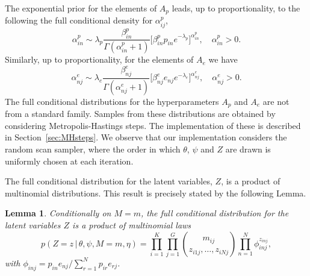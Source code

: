 \documentclass[11pt]{amsart}
\newtheorem{lemma}{Lemma}
\theoremstyle{definition}
\begin{document}
The exponential prior for the elements of $A_p$ leads, up to
proportionality, to the following the full conditional density
for $\alpha_{ij}^p$,
\begin{equation}
 \label{eqn:Full_for_Ap}
  \alpha_{in}^p
  \sim
  \lambda_p\frac{\beta_{in}^p}{\Gamma(\alpha_{in}^p + 1)}
   \Big[\beta_{in}^pp_{in}
   e^{-\lambda_p}\Big]^{\alpha_{in}^p}, \tag{$s_6$}
   \quad  \alpha_{in}^p > 0.
\end{equation}
Similarly, up to proportionality, for the elements of $A_e$ we
have
\begin{equation}
 \label{eqn:Full_for_Ae}
  \alpha_{nj}^e
  \sim
  \lambda_e\frac{\beta_{nj}^e}{\Gamma(\alpha_{nj}^e + 1)}
   \Big[\beta_{nj}^e e_{nj}
   e^{-\lambda_e}\Big]^{\alpha_{nj}^e},
   \quad  \alpha_{nj}^e > 0. \tag{$s_7$}
\end{equation}
The full conditional distributions for the hyperparameters $A_p$ and
$A_e$ are not from a standard family. Samples from these distributions
are obtained by considering Metropolis-Hastings steps. The
implementation of these is described in Section~\ref{sec:MHsteps}. We
observe that our implementation considers the random scan sampler,
where the order in which $\theta$, $\psi$ and $Z$ are drawn is
uniformly chosen at each iteration.


The full conditional distribution for the latent variables, $Z$, is a
product of multinomial distributions. This result is precisely stated
by the following Lemma.

\begin{lemma}\label{lem:Full_for_Z} Conditionally on  $M= m$, the full
  conditional distribution for the latent variables $Z$ is a  product
  of multinomial laws
\[
   p(Z = z\,|\, \theta, \psi, M=m, \eta)
   =
   \prod_{i=1}^K\prod_{j=1}^G {m_{ij} \choose z_{i1j}, \ldots,
     z_{iNj}}
   \prod_{n=1}^N \phi_{inj}^{z_{inj}},
\]
with $\phi_{inj} = p_{in} e_{nj}/\sum_{r=1}^N p_{ir}e_{rj}$.
\end{lemma}
\end{document}
